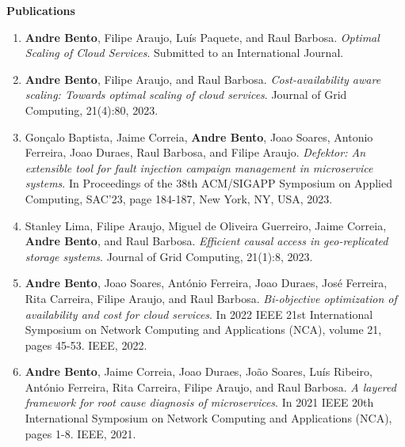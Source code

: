 \documentclass[a4paper,9pt]{memoir}
\newcommand{\Sep}{\vspace{1em}} %
\newcommand{\SmallSep}{\vspace{0.5em}} %
\newcommand{\CVSection}[1]{ %
    {\Large\textbf{#1}}\par
    \SmallSep %
}
\begin{document}
\Sep

\CVSection{Publications}

\begin{enumerate}[leftmargin=*]
	\item \textbf{Andre Bento}, Filipe Araujo, Luís Paquete, and Raul Barbosa. 
	\emph{Optimal Scaling of Cloud Services}. Submitted to an International Journal.
	\item \textbf{Andre Bento}, Filipe Araujo, and Raul Barbosa. \emph{Cost-availability aware scaling: Towards optimal scaling of cloud services}. Journal of Grid Computing, 21(4):80, 2023.%
	\item Gonçalo Baptista, Jaime Correia, \textbf{Andre Bento}, Joao Soares, Antonio Ferreira, Joao Duraes, Raul Barbosa, and Filipe Araujo. \emph{Defektor: An extensible tool for fault injection campaign management in microservice systems}. In Proceedings of the 38th ACM/SIGAPP Symposium on Applied Computing, SAC'23, page 184-187, New York, NY, USA, 2023.%
	\item Stanley Lima, Filipe Araujo, Miguel de Oliveira Guerreiro, Jaime Correia, \textbf{Andre Bento}, and Raul Barbosa. \emph{Efficient causal access in geo-replicated storage systems}. Journal of Grid Computing, 21(1):8, 2023.%
	\item \textbf{Andre Bento}, Joao Soares, António Ferreira, Joao Duraes, José Ferreira, Rita Carreira, Filipe Araujo, and Raul Barbosa. \emph{Bi-objective optimization of availability and cost for cloud services}. In 2022 IEEE 21st International Symposium on Network Computing and Applications (NCA), volume 21, pages 45-53. IEEE, 2022.%
	\item \textbf{Andre Bento}, Jaime Correia, Joao Duraes, João Soares, Luís Ribeiro, António Ferreira, Rita Carreira, Filipe Araujo, and Raul Barbosa. \emph{A layered framework for root cause diagnosis of microservices}. In 2021 IEEE 20th International Symposium on Network Computing and Applications (NCA), pages 1-8. IEEE, 2021.%

\end{enumerate}
\end{document}
